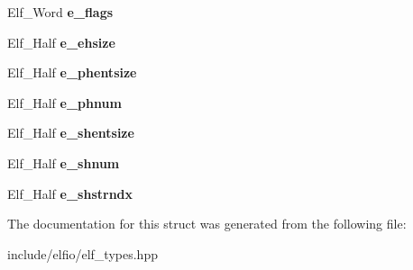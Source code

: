 \begin{DoxyCompactItemize}
\item 
Elf\+\_\+\+Word {\bfseries e\+\_\+flags}\hypertarget{struct_e_l_f_i_o_1_1_elf32___ehdr_a68eb1704f474c1d80d77f09aa8938b5f}{}\label{struct_e_l_f_i_o_1_1_elf32___ehdr_a68eb1704f474c1d80d77f09aa8938b5f}

\item 
Elf\+\_\+\+Half {\bfseries e\+\_\+ehsize}\hypertarget{struct_e_l_f_i_o_1_1_elf32___ehdr_ada1e059180daa7ad02aae7ae76c07672}{}\label{struct_e_l_f_i_o_1_1_elf32___ehdr_ada1e059180daa7ad02aae7ae76c07672}

\item 
Elf\+\_\+\+Half {\bfseries e\+\_\+phentsize}\hypertarget{struct_e_l_f_i_o_1_1_elf32___ehdr_a195a6a359dd48b1d543825cebeb35378}{}\label{struct_e_l_f_i_o_1_1_elf32___ehdr_a195a6a359dd48b1d543825cebeb35378}

\item 
Elf\+\_\+\+Half {\bfseries e\+\_\+phnum}\hypertarget{struct_e_l_f_i_o_1_1_elf32___ehdr_a9517dc4865f264635a93e1c3a2cc9677}{}\label{struct_e_l_f_i_o_1_1_elf32___ehdr_a9517dc4865f264635a93e1c3a2cc9677}

\item 
Elf\+\_\+\+Half {\bfseries e\+\_\+shentsize}\hypertarget{struct_e_l_f_i_o_1_1_elf32___ehdr_a8c458f3e280fa7b351202bfccf32a493}{}\label{struct_e_l_f_i_o_1_1_elf32___ehdr_a8c458f3e280fa7b351202bfccf32a493}

\item 
Elf\+\_\+\+Half {\bfseries e\+\_\+shnum}\hypertarget{struct_e_l_f_i_o_1_1_elf32___ehdr_a3d6594e7731b4f021a8531660a5a786b}{}\label{struct_e_l_f_i_o_1_1_elf32___ehdr_a3d6594e7731b4f021a8531660a5a786b}

\item 
Elf\+\_\+\+Half {\bfseries e\+\_\+shstrndx}\hypertarget{struct_e_l_f_i_o_1_1_elf32___ehdr_a2b95e485567a93fef5836c2489a202fd}{}\label{struct_e_l_f_i_o_1_1_elf32___ehdr_a2b95e485567a93fef5836c2489a202fd}

\end{DoxyCompactItemize}


The documentation for this struct was generated from the following file\+:\begin{DoxyCompactItemize}
\item 
include/elfio/elf\+\_\+types.\+hpp\end{DoxyCompactItemize}
